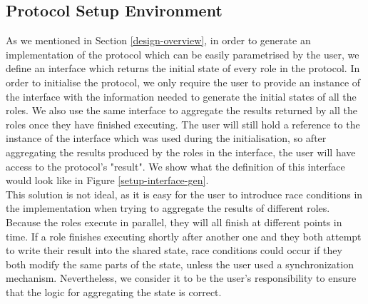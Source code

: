 \documentclass[12pt,twoside]{report}
\begin{document}
\subsection{Protocol Setup Environment}\label{protocol-setup-env}

As we mentioned in Section \ref{design-overview}, in order to generate an implementation of the protocol which can be easily parametrised by the user, we define an interface which returns the initial state of every role in the protocol. In order to initialise the protocol, we only require the user to provide an instance of the interface with the information needed to generate the initial states of all the roles. We also use the same interface to aggregate the results returned by all the roles once they have finished executing. The user will still hold a reference to the instance of the interface which was used during the initialisation, so after aggregating the results produced by the roles in the interface, the user will have access to the protocol's "result". We show what the definition of this interface would look like in Figure \ref{setup-interface-gen}.\\

This solution is not ideal, as it is easy for the user to introduce race conditions in the implementation when trying to aggregate the results of different roles. Because the roles execute in parallel, they will all finish at different points in time. If a role finishes executing shortly after another one and they both attempt to write their result into the shared state, race conditions could occur if they both modify the same parts of the state, unless the user used a synchronization mechanism. Nevertheless, we consider it to be the user's responsibility to ensure that the logic for aggregating the state is correct.
\end{document}
